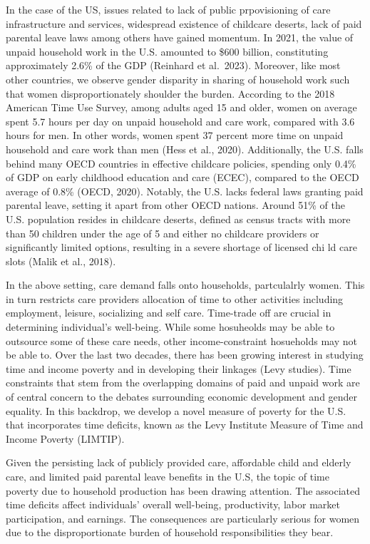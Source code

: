 \documentclass[
  11pt,
]{article}
\begin{document}
In the case of the US, issues related to lack of public prpovisioning of
care infrastructure and services, widespread existence of childcare
deserts, lack of paid parental leave laws among others have gained
momentum. In 2021, the value of unpaid household work in the U.S.
amounted to \$600 billion, constituting approximately 2.6\% of the GDP
(Reinhard et al.~2023). Moreover, like most other countries, we observe
gender disparity in sharing of household work such that women
disproportionately shoulder the burden. According to the 2018 American
Time Use Survey, among adults aged 15 and older, women on average spent
5.7 hours per day on unpaid household and care work, compared with 3.6
hours for men. In other words, women spent 37 percent more time on
unpaid household and care work than men (Hess et al., 2020).
Additionally, the U.S. falls behind many OECD countries in effective
childcare policies, spending only 0.4\% of GDP on early childhood
education and care (ECEC), compared to the OECD average of 0.8\% (OECD,
2020). Notably, the U.S. lacks federal laws granting paid parental
leave, setting it apart from other OECD nations. Around 51\% of the U.S.
population resides in childcare deserts, defined as census tracts with
more than 50 children under the age of 5 and either no childcare
providers or significantly limited options, resulting in a severe
shortage of licensed chi ld care slots (Malik et al., 2018).

In the above setting, care demand falls onto households, partculalrly
women. This in turn restricts care providers allocation of time to other
activities including employment, leisure, socializing and self care.
Time-trade off are crucial in determining individual's well-being. While
some hosuheolds may be able to outsource some of these care needs, other
income-constraint hosueholds may not be able to. Over the last two
decades, there has been growing interest in studying time and income
poverty and in developing their linkages (Levy studies). Time
constraints that stem from the overlapping domains of paid and unpaid
work are of central concern to the debates surrounding economic
development and gender equality. In this backdrop, we develop a novel
measure of poverty for the U.S. that incorporates time deficits, known
as the Levy Institute Measure of Time and Income Poverty (LIMTIP).

Given the persisting lack of publicly provided care, affordable child
and elderly care, and limited paid parental leave benefits in the U.S,
the topic of time poverty due to household production has been drawing
attention. The associated time deficits affect individuals' overall
well-being, productivity, labor market participation, and earnings. The
consequences are particularly serious for women due to the
disproportionate burden of household responsibilities they bear.
\end{document}
